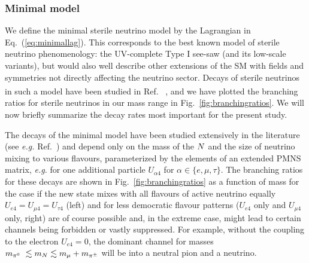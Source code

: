 \documentclass[11pt, a4paper]{article}
\newcommand{\refeq}[1]{Eq.~(\ref{#1})}
\newcommand{\reffig}[1]{Fig.~\ref{#1}}
\newcommand{\refref}[1]{Ref.~\cite{#1}}
\def\ster{\ensuremath N}
\newcounter{CommentCount}
\newcommand{\marcom}[2]{\textsuperscript{\textcolor{#1}{\theCommentCount}}\marginpar{\textsuperscript{\textcolor{#1}{\theCommentCount}}\textcolor{#1}{{\small#1: #2}}}\stepcounter{CommentCount}}
\begin{document}
\subsubsection{\label{sec:minimal}Minimal model}

We define the minimal sterile neutrino model by the Lagrangian in
\refeq{eq:minimallag}. This corresponds to the best known model of sterile
neutrino phenomenology: the UV-complete Type I see-saw (and its low-scale
variants), but would also well describe other extensions of the SM with fields
and symmetries not directly affecting the neutrino sector. Decays of sterile
neutrinos in such a model have been studied in \refref{Atre:2009rg}
\marcom{PB}{Others?}, and we have plotted the branching ratios for sterile
neutrinos in our mass range in \reffig{fig:branchingratios}. We will now
briefly summarize the decay rates most important for the present study.

The decays of the minimal model have been studied extensively in the literature
(see \emph{e.g.} \refref{Atre:2009rg}) and depend only on the mass of the
$\ster$ and the size of neutrino mixing to various flavours, parameterized by
the elements of an extended PMNS matrix, \emph{e.g.} for one additional
particle 
%
$U_{\alpha 4}$ for $\alpha \in \{e,\mu,\tau\}$. 
%
The branching ratios for these decays are shown in \reffig{fig:branchingratios}
as a function of mass for the case if the new state mixes with all flavours of
active neutrino equally $U_{e4}=U_{\mu 4}=U_{\tau 4}$ (left) and for less
democratic flavour patterns ($U_{e4}$ only and $U_{\mu 4}$ only, right) are of
course possible and, in the extreme case, might lead to certain channels being
forbidden or vastly suppressed. For example, without the coupling to the
electron $U_{e4}=0$, the dominant channel for masses $m_{\pi^0}~\lesssim
m_\ster \lesssim m_{\mu}+m_{\pi^\pm}$ will be into a neutral pion and a
neutrino.
\end{document}
